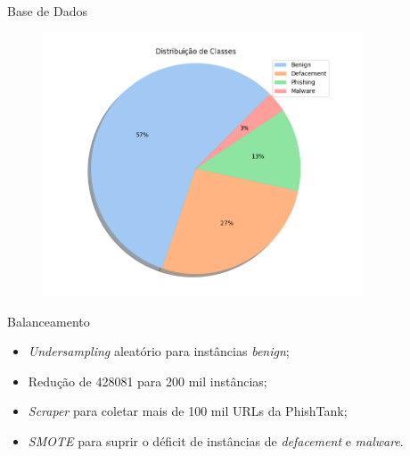 \documentclass{beamer}
\begin{document}
\begin{frame}{Base de Dados}
    
    \begin{figure}
        \centering
        \includegraphics[width=0.85\textwidth]{pic/class.png}
        \label{fig:map1}
    \end{figure}
    
\end{frame}

\begin{frame}{Balanceamento}
    
    \begin{itemize}
        \setlength{\itemsep}{10pt}
        \item \emph{Undersampling} aleatório para instâncias \emph{benign};
        \item Redução de 428081 para 200 mil instâncias;
        \item \emph{Scraper} para coletar mais de 100 mil URLs da PhishTank;
        \item \emph{SMOTE} \cite{DBLP:journals/corr/abs-1106-1813} para suprir o déficit de instâncias de \emph{defacement} e \emph{malware}.
    \end{itemize}
    
\end{frame}
\end{document}
